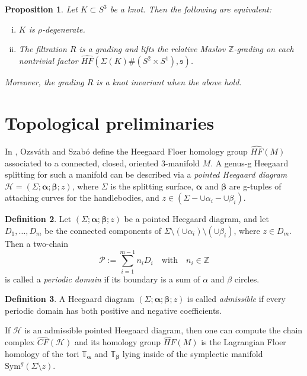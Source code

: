 \documentclass[11pt]{article}
\theoremstyle{plain} \newtheorem{thm}{Theorem}[subsection]
\theoremstyle{plain} \newtheorem{cor}[thm]{Corollary}
\theoremstyle{plain} \newtheorem{prop}[thm]{Proposition}
\theoremstyle{plain} \newtheorem{conj}[thm]{Conjecture}
\theoremstyle{plain} \newtheorem{lem}[thm]{Lemma}
\theoremstyle{definition} \newtheorem{df}[thm]{Definition}
\theoremstyle{remark} \newtheorem{rmk}[thm]{Remark}
\theoremstyle{remark} \newtheorem{obs}[thm]{Observation}
\newcommand{\DBCs}[1]{\Sigma(#1)\#(S^{2}\times S^{1})}
\newcommand{\h}{\mathcal{H}}
\newcommand{\OS}{Ozsv\'ath and Szab\'o }
\newcommand{\HFxs}[1]{\widehat{HF}(\DBCs{#1}, \mathfrak{s})}
\newcommand{\ba}{\boldsymbol{\alpha}}
\newcommand{\bb}{\boldsymbol{\beta}}
\newcommand{\Ta}{\mathbb{T}_{\ba}}
\newcommand{\Tb}{\mathbb{T}_{\bb}}
\begin{document}
\begin{prop}\label{prop:Rdeg}
Let $K \subset S^{3}$ be a knot.  Then the following are equivalent:
\begin{enumerate}[(i)]
\item $K$ is $\rho$-degenerate. \label{Rdeg:1}
\item The filtration $R$ is a grading and lifts the relative Maslov $\mathbb{Z}$-grading on each nontrivial factor $\HFxs{K}$. \label{Rdeg:2}
\end{enumerate}
Moreover, the grading $R$ is a knot invariant when the above hold.
\end{prop}

\section{Topological preliminaries}

In \cite{os:disk}, \OS define the Heegaard Floer homology group $\widehat{HF}(M)$ associated to a connected, closed, oriented 3-manifold $M$.  A genus-g Heegaard splitting for such a manifold can be described via a \textit{pointed Heegaard diagram} $\h = \left(\Sigma; \ba; \bb; z\right)$, where $\Sigma$ is the splitting surface, $\ba$ and $\bb$ are g-tuples of attaching curves for the handlebodies, and $z \in (\Sigma - \cup \alpha_{i} - \cup \beta_{i})$.

\begin{df}
Let $\left(\Sigma; \ba; \bb; z\right)$ be a pointed Heegaard diagram, and let $D_1, \ldots, D_m$ be the connected components of $\Sigma \setminus \left( \cup \alpha_i \right) \setminus \left( \cup \beta_i \right)$, where $z \in D_m$.  Then a two-chain
$$ \mathcal{P}:= \sum_{i =1}^{m-1}n_{i} D_i \quad \text{with} \quad n_i \in \mathbb{Z}$$
is called a \textit{periodic domain} if its boundary is a sum of $\alpha$ and $\beta$ circles.
\end{df}

\begin{df}
A Heegaard diagram $\left(\Sigma; \ba; \bb; z\right)$ is called \textit{admissible} if every periodic domain has both positive and negative coefficients.
\end{df}

If $\h$ is an admissible pointed Heegaard diagram, then one can compute the chain complex $\widehat{CF}(\h)$ and its homology group $\widehat{HF}(M)$ is the Lagrangian Floer homology of the tori $\Ta$ and $\Tb$ lying inside of the symplectic manifold $\text{Sym}^g \left( \Sigma \setminus z \right)$.
\end{document}
